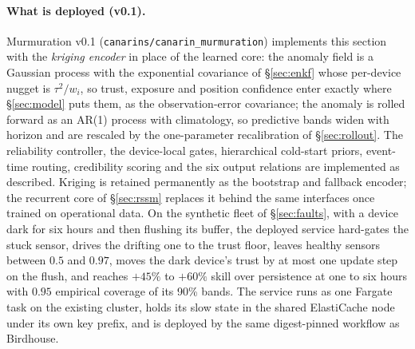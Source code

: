 \documentclass[10pt]{article}
\begin{document}
\paragraph{What is deployed (v0.1).}
\label{sec:deployed}
Murmuration v0.1 (\texttt{canarins/canarin\_murmuration}) implements this
section with the \emph{kriging encoder} in place of the learned core: the
anomaly field is a Gaussian process with the exponential covariance of
\S\ref{sec:enkf} whose per-device nugget is $\tau^2/w_i$, so trust, exposure and
position confidence enter exactly where \S\ref{sec:model} puts them, as the
observation-error covariance; the anomaly is rolled forward as an AR(1) process
with climatology, so predictive bands widen with horizon and are rescaled by the
one-parameter recalibration of \S\ref{sec:rollout}. The reliability controller,
the device-local gates, hierarchical cold-start priors, event-time routing,
credibility scoring and the six output relations are implemented as described.
Kriging is retained permanently as the bootstrap and fallback encoder; the
recurrent core of \S\ref{sec:rssm} replaces it behind the same interfaces once
trained on operational data. On the synthetic fleet of \S\ref{sec:faults}, with a
device dark for six hours and then flushing its buffer, the deployed service
hard-gates the stuck sensor, drives the drifting one to the trust floor, leaves
healthy sensors between $0.5$ and $0.97$, moves the dark device's trust by at
most one update step on the flush, and reaches $+45\%$ to $+60\%$ skill over
persistence at one to six hours with $0.95$ empirical coverage of its 90\% bands.
The service runs as one Fargate task on the existing cluster, holds its slow
state in the shared ElastiCache node under its own key prefix, and is deployed by
the same digest-pinned workflow as Birdhouse.
\end{document}
